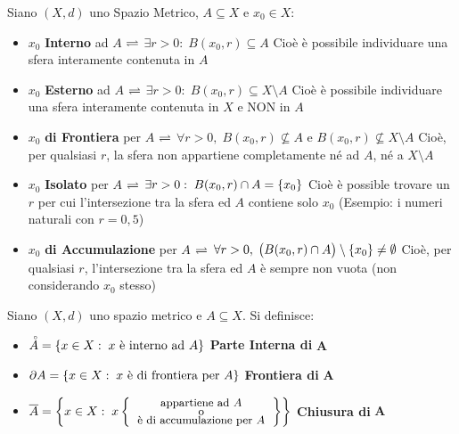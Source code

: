 \begin{definition}
	\label{def:pti_e_spa_metr}
	Siano $(X,d)$ uno Spazio Metrico, $A \subseteq X$ e $x_0 \in X$:
	\begin{itemize}
		\item $x_0$ \textbf{Interno} ad $A$ \quad $\rightleftharpoons$ \quad $\exists r > 0:\; B(x_0, r) \subseteq A$\newline
			{\footnotesize Cioè è possibile individuare una sfera interamente contenuta in $A$}
		\item $x_0$ \textbf{Esterno} ad $A$ \quad $\rightleftharpoons$ \quad $\exists r > 0:\; B(x_0, r) \subseteq X \setminus A$\newline
			{\footnotesize Cioè è possibile individuare una sfera interamente contenuta in $X$ e NON in $A$}
		\item $x_0$ \textbf{di Frontiera} per $A$ \quad $\rightleftharpoons$ \quad $\forall r > 0,\; B(x_0, r) \nsubseteq A \text{ e } B(x_0, r) \nsubseteq X \setminus A$\newline
			{\footnotesize Cioè, per qualsiasi $r$, la sfera non appartiene completamente né ad $A$, né a $X \setminus A$}
		\item $x_0$ \textbf{Isolato} per $A$ \quad $\rightleftharpoons$ \quad $\exists r > 0:\; B(x_0, r) \cap A = \left\{x_0\right\}$\newline
			{\footnotesize Cioè è possible trovare un $r$ per cui l'intersezione tra la sfera ed $A$ contiene solo $x_0$ (Esempio: i numeri naturali con $r = 0,5$)}
		\item $x_0$ \textbf{di Accumulazione} per $A$ \quad $\rightleftharpoons$ \quad $\forall r > 0,\; \bigl( B(x_0, r) \cap A \bigr) \setminus \left\{x_0\right\} \neq \emptyset$\newline
			{\footnotesize Cioè, per qualsiasi $r$, l'intersezione tra la sfera ed $A$ è sempre non vuota (non considerando $x_0$ stesso)}
	\end{itemize}
\end{definition}
\begin{definition}
	\label{def:topologia_spa_metri}
	Siano $(X,d)$ uno spazio metrico e $A \subseteq X$. Si definisce:
	\begin{itemize}
		\item $\accentset{\circ}{A} = \left\{x \in X:\; x \text{ è interno ad } A\right\}$ \hfill \textbf{Parte Interna di} $\boldsymbol{A}$
		\item $\partial A = \left\{x \in X:\; x \text{ è di frontiera per } A\right\}$ \hfill \textbf{Frontiera di} $\boldsymbol{A}$
		\item $\overline{A} = \brackets{x \in X:\; x \brackets{\text{\small\begin{tabular}{c}appartiene ad $A$\\[-1ex] o\\[-1ex] è di accumulazione per $A$\end{tabular}}}}$ \hfill \textbf{Chiusura di} $\boldsymbol{A}$
	\end{itemize}
\end{definition}
